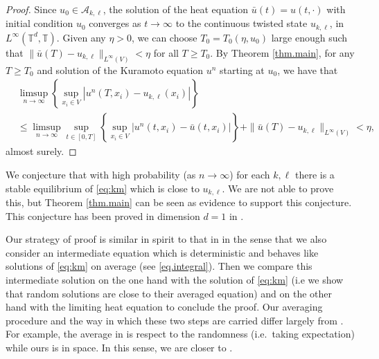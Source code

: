 \documentclass[a4paper,11pt]{amsart}
\newcommand{\T}{\mathbb{T}}
\newcommand{\ep}{\epsilon}
\newcommand{\purple}[1]{{\color{purple}#1}}{}
\numberwithin{equation}{section}
\numberwithin{theorem}{section}
\theoremstyle{definition}
\begin{document}
\begin{proof}
Since $u_0\in\mathcal A_{k,\ell}$, the solution of the heat equation $\bar u(t)= u(t, \cdot)$ with initial condition $u_0$ converges as $t\to\infty$ to the continuous twisted state $u_{k,\ell}$, in $L^\infty(\mathbb T^d, \T)$. Given any $\eta>0$, we can choose $T_0=T_0(\eta, u_0)$ large enough such that $\|\bar u(T)-u_{k,\ell}\|_{L^\infty(V)}<\eta$ for all $T\ge T_0$. By Theorem \ref{thm.main}, for any $T\ge T_0$ and solution of the Kuramoto equation $u^n$ starting at $u_0$, we have that
\begin{align*}
&\limsup_{n\to\infty}\left\{\sup_{x_i\in V}|u^n(T,x_i)-u_{k,\ell}(x_i)|\right\}\\
&\le \limsup_{n\to\infty}\sup_{t\in[0,T]}\left\{\sup_{x_i\in V}|u^n(t,x_i)-\bar u(t, x_i)|\right\}+\|\bar u(T)-u_{k,\ell}\|_{L^\infty(V)}<\eta,
\end{align*}
almost surely.
\end{proof}
We conjecture that with high probability (as $n\to\infty$) for each $k,\ell$ there is a stable equilibrium of \eqref{eq:km} which is close to $u_{k,\ell}$. We are not able to prove this, but Theorem \ref{thm.main} can be seen as evidence to support this conjecture. This conjecture has been proved in dimension $d=1$ in \cite{devita2024energy}.


Our strategy of proof is similar in spirit to that in \cite{medvedev2018continuum} in the sense that we also consider an intermediate equation which is deterministic and behaves like solutions of \eqref{eq:km} on average (see \eqref{eq.integral}). Then we compare this intermediate solution on the one hand with the solution of \eqref{eq:km} (i.e we show that random solutions are close to their averaged equation) and on the other hand with the limiting heat equation to conclude the proof. Our averaging procedure and the way in which these two steps are carried differ largely from \cite{medvedev2018continuum}. For example, the average in \cite{medvedev2018continuum} is respect to the randomness (i.e.~taking expectation) while ours is in space. In this sense, we are closer to \cite{calder2019game, trillos2020error, trillos2016continuum}.
\end{document}
